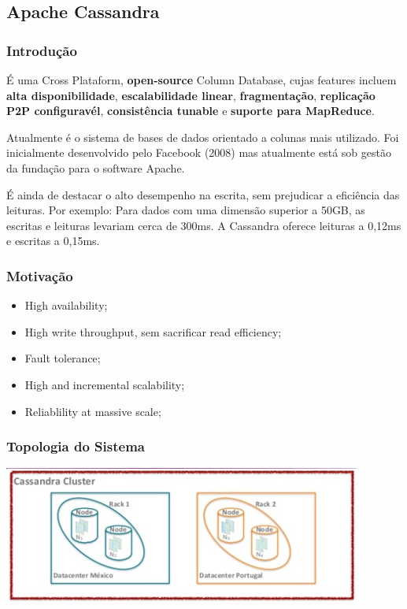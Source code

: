 \documentclass{article}
\begin{document}
\pagebreak

\subsection{Apache Cassandra}

\subsubsection{Introdução}

É uma Cross Plataform, \textbf{open-source} Column Database, cujas features incluem
\textbf{alta disponibilidade}, \textbf{escalabilidade linear},
\textbf{fragmentação}, \textbf{replicação P2P configuravél},
\textbf{consistência tunable} e \textbf{suporte para MapReduce}.

Atualmente é o sistema de bases de dados orientado a colunas mais utilizado.
Foi inicialmente desenvolvido pelo Facebook (2008) mas atualmente está sob gestão da
fundação para o software Apache.

É ainda de destacar o alto desempenho na escrita, sem prejudicar a eficiência das leituras.
Por exemplo: Para dados com uma dimensão superior a 50GB, as escritas e leituras levariam cerca de 300ms. A Cassandra oferece
leituras a 0,12ms e escritas a 0,15ms.

\subsubsection{Motivação}
\begin{itemize}
  \item High availability;
  \item High write throughput, sem sacrificar read efficiency;
  \item Fault tolerance;
  \item High and incremental scalability;
  \item Reliablility at massive scale;
\end{itemize}

\subsubsection{Topologia do Sistema}

\begin{center}
  \includegraphics[scale=0.3]{13}
\end{center}
\end{document}
